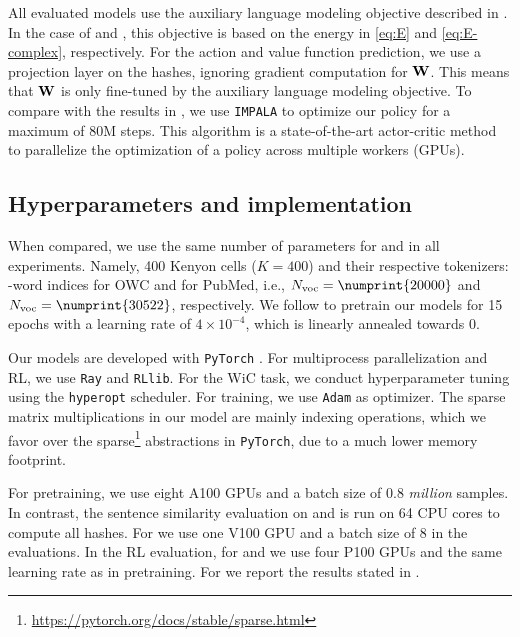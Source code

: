\par
All evaluated models use the auxiliary language modeling objective described in \cite{ddxgym}.
In the case of \pflyvec and \methodname, this objective is based on the energy in \cref{eq:E} and \cref{eq:E-complex}, respectively.
For the action and value function prediction, we use a projection layer on the hashes, ignoring gradient computation for $\boldsymbol{\mathbf{W}}$.
This means that $\boldsymbol{\mathbf{W}}$ is only fine-tuned by the auxiliary language modeling objective.
To compare with the results in \cite{ddxgym}, we use \texttt{IMPALA} \cite{espeholt2018impala} to optimize our policy for a maximum of 80M steps.
This algorithm is a state-of-the-art actor-critic method to parallelize the optimization of a policy across multiple workers (GPUs).

\subsection{Hyperparameters and implementation}
When compared, we use the same number of parameters for \flyvec and \methodname in all experiments.
Namely, 400 Kenyon cells ($K=400$) and their respective tokenizers: -word indices for OWC and  for PubMed, i.e., $\nvoc=\numprint{20000}$ and $\nvoc=\numprint{30522}$, respectively.
We follow \flyvec to pretrain our models for 15 epochs with a learning rate of $4\times10^{-4}$, which is linearly annealed towards $0$.

\par
Our models are developed with \texttt{PyTorch} \cite{paszke2019pytorch}.
For multiprocess parallelization and RL, we use \texttt{Ray} \cite{ray} and \texttt{RLlib}\cite{liang2018rllib}.
For the WiC task, we conduct hyperparameter tuning using the \texttt{hyperopt}\cite{hyperopt} scheduler.
For training, we use \texttt{Adam} \cite{adam} as optimizer.
The sparse matrix multiplications in our model are mainly indexing operations, which we favor over the sparse\footnote{\url{https://pytorch.org/docs/stable/sparse.html}} abstractions in \texttt{PyTorch}, due to a much lower memory footprint. 

\par
For pretraining, we use eight A100 GPUs and a batch size of 0.8 \textit{million} samples.
In contrast, the sentence similarity evaluation on \flyvec and \methodname is run on 64 CPU cores to compute all hashes.
For \bert we use one V100 GPU and a batch size of 8 in the evaluations.
In the RL evaluation, for \pflyvec and \methodname we use four P100 GPUs and the same learning rate as in pretraining.
For \transmlm we report the results stated in \cite{ddxgym}.
